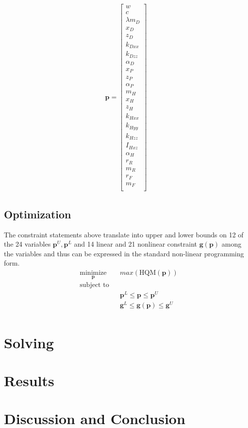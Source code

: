 \documentclass{bmd2019a}
\begin{document}
\begin{align}
  \mathbf{p} =
  \begin{bmatrix}
    w \\
    c \\
    \lambda
    m_D \\
    x_D \\
    z_D \\
    k_{Dxx} \\
    k_{Dzz} \\
    \alpha_D \\
    x_P \\
    z_P \\
    \alpha_P \\
    m_H \\
    x_H \\
    z_H \\
    k_{Hxx} \\
    k_{Hyy} \\
    k_{Hzz} \\
    I_{Hxz} \\
    \alpha_H \\
    r_R \\
    m_R \\
    r_F \\
    m_F \\
  \end{bmatrix}
\end{align}










\subsection*{Optimization}
%
The constraint statements above translate into upper and lower bounds on 12 of
the 24 variables $\mathbf{p}^U,\mathbf{p}^L$ and 14 linear and 21 nonlinear
constraint $\mathbf{g}(\mathbf{p})$ among the variables and thus can be
expressed in the standard non-linear programming form.
%
\begin{equation}
  \begin{aligned}
    & \underset{\mathbf{p}}{\text{minimize}} & & max(\textrm{HQM}(\mathbf{p})) \\
    & \text{subject to} & & \\
    & & & \mathbf{p}^L \leq \mathbf{p} \leq \mathbf{p}^U \\
    & & & \mathbf{g}^L \leq \mathbf{g}(\mathbf{p}) \leq \mathbf{g}^U \\
  \end{aligned}
\end{equation}

\section*{Solving}
\section*{Results}
\section*{Discussion and Conclusion}
\end{document}
